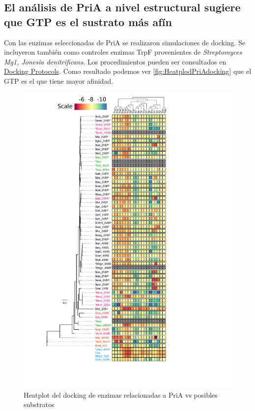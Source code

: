 \documentclass[12pt,twoside]{reedthesis}
\begin{document}
  \subsection{El análisis de PriA a nivel estructural sugiere que GTP es
  el sustrato más
  afín}\label{el-analisis-de-pria-a-nivel-estructural-sugiere-que-gtp-es-el-sustrato-mas-afin}
  
  Con las enzimas seleccionadas de PriA se realizaron simulaciones de
  docking. Se incluyeron también como controles enzimas TrpF provenientes
  de \emph{Streptomyces Mg1, Jonesia denitrificans}. Los procedimientos
  pueden ser consultados en
  \href{https://github.com/tripplab/Docking/wiki}{Docking Protocols}. Como
  resultado podemos ver \autoref{fig:HeatplodPriAdocking} que el GTP es el
  que tiene mayor afinidad.
  
  \begin{figure}[h!tbp]
  \centering
  \includegraphics[angle = 0,scale = .7]{chapter4/Figura1_4.pdf}
  \caption[Heatplot del docking de enzimas relacionadas a PriA vs posibles substratos]{\footnotesize{Heatplot del docking de enzimas relacionadas a PriA vs posibles substratos}}
  \label{fig:HeatplodPriAdocking}
  \end{figure}
  
\end{document}
